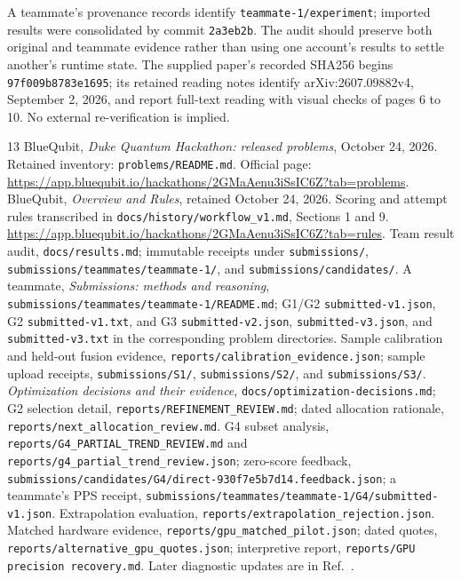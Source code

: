 \documentclass[11pt]{article}
\newcommand{\file}[1]{\nolinkurl{#1}}
\begin{document}
A teammate's provenance records identify \file{teammate-1/experiment}; imported results were consolidated by commit \file{2a3eb2b}. The audit should preserve both original and teammate evidence rather than using one account's results to settle another's runtime state. The supplied paper's recorded SHA256 begins \file{97f009b8783e1695}; its retained reading notes identify arXiv:2607.09882v4, September 2, 2026, and report full-text reading with visual checks of pages 6 to 10. No external re-verification is implied.\cite{ledger,teammate-1,paper}

\vspace{-0.3em}
\begin{thebibliography}{13}
\small
\setlength{\itemsep}{3pt}
 BlueQubit, \emph{Duke Quantum Hackathon: released problems}, October 24, 2026. Retained inventory: \file{problems/README.md}. Official page: \url{https://app.bluequbit.io/hackathons/2GMaAenu3iSsIC6Z?tab=problems}.
 BlueQubit, \emph{Overview and Rules}, retained October 24, 2026. Scoring and attempt rules transcribed in \file{docs/history/workflow_v1.md}, Sections 1 and 9. \url{https://app.bluequbit.io/hackathons/2GMaAenu3iSsIC6Z?tab=rules}.
 Team result audit, \file{docs/results.md}; immutable receipts under \file{submissions/}, \file{submissions/teammates/teammate-1/}, and \file{submissions/candidates/}.
 A teammate, \emph{Submissions: methods and reasoning}, \file{submissions/teammates/teammate-1/README.md}; G1/G2 \file{submitted-v1.json}, G2 \file{submitted-v1.txt}, and G3 \file{submitted-v2.json}, \file{submitted-v3.json}, and \file{submitted-v3.txt} in the corresponding problem directories.
 Sample calibration and held-out fusion evidence, \file{reports/calibration_evidence.json}; sample upload receipts, \file{submissions/S1/}, \file{submissions/S2/}, and \file{submissions/S3/}.
 \emph{Optimization decisions and their evidence}, \file{docs/optimization-decisions.md}; G2 selection detail, \file{reports/REFINEMENT_REVIEW.md}; dated allocation rationale, \file{reports/next_allocation_review.md}.
 G4 subset analysis, \file{reports/G4_PARTIAL_TREND_REVIEW.md} and \file{reports/g4_partial_trend_review.json}; zero-score feedback, \file{submissions/candidates/G4/direct-930f7e5b7d14.feedback.json}; a teammate's PPS receipt, \file{submissions/teammates/teammate-1/G4/submitted-v1.json}.
 Extrapolation evaluation, \file{reports/extrapolation_rejection.json}.
 Matched hardware evidence, \file{reports/gpu_matched_pilot.json}; dated quotes, \file{reports/alternative_gpu_quotes.json}; interpretive report, \file{reports/GPU precision recovery.md}. Later diagnostic updates are in Ref.~\cite{decisions}.

\end{thebibliography}
\end{document}
